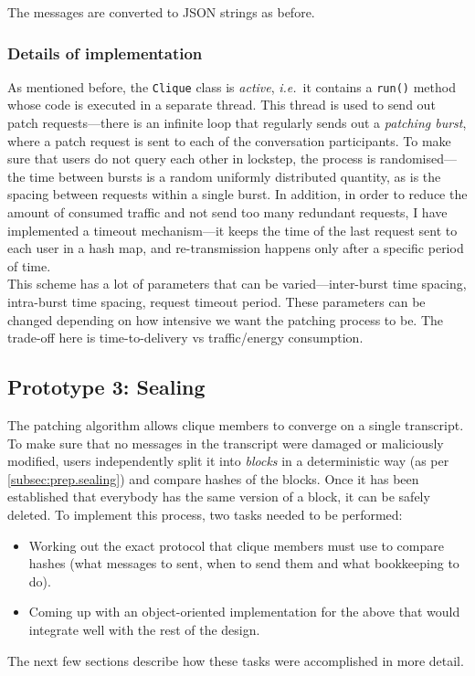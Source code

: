 \documentclass[a4paper, twoside, 12pt]{report}
\begin{document}
The messages are converted to JSON strings as before.


\subsubsection{Details of implementation}
As mentioned before, the \texttt{Clique} class is \emph{active}, \textit{i.e.}~it contains a \texttt{run()} method whose code is executed in a separate thread. This thread is used to send out patch requests---there is an infinite loop that regularly sends out a \emph{patching burst}, where a patch request is sent to each of the conversation participants. To make sure that users do not query each other in lockstep, the process is randomised---the time between bursts is a random uniformly distributed quantity, as is the spacing between requests within a single burst. In addition, in order to reduce the amount of consumed traffic and not send too many redundant requests, I have implemented a timeout mechanism---it keeps the time of the last request sent to each user in a hash map, and re-transmission happens only after a specific period of time. \\

This scheme has a lot of parameters that can be varied---inter-burst time spacing, intra-burst time spacing, request timeout period. These parameters can be changed depending on how intensive we want the patching process to be. The trade-off here is time-to-delivery vs traffic/energy consumption. 

\pagebreak

\subsection{Prototype 3: Sealing}
\label{subsec:impl.proto.sealing}
The patching algorithm allows clique members to converge on a single transcript. To make sure that no messages in the transcript were damaged or maliciously modified, users independently split it into \emph{blocks} in a deterministic way (as per \cref{subsec:prep.sealing}) and compare hashes of the blocks. Once it has been established that everybody has the same version of a block, it can be safely deleted. To implement this process, two tasks needed to be performed:

\begin{itemize}
    \item Working out the exact protocol that clique members must use to compare hashes (what messages to sent, when to send them and what bookkeeping to do).
    \item Coming up with an object-oriented implementation for the above that would integrate well with the rest of the design.
\end{itemize}
The next few sections describe how these tasks were accomplished in more detail.
\end{document}
